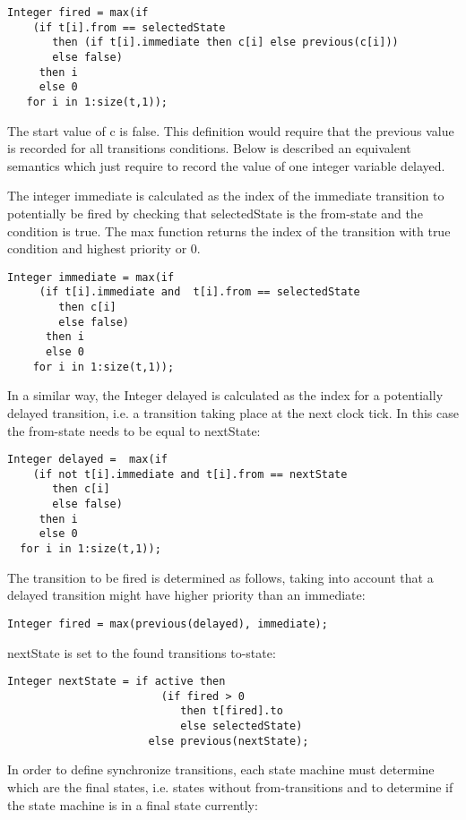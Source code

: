 \begin{lstlisting}[language=modelica]
  Integer fired = max(if
    (if t[i].from == selectedState
	   then (if t[i].immediate then c[i] else previous(c[i]))
	   else false)
	 then i
	 else 0
   for i in 1:size(t,1));
\end{lstlisting}
The start value of c is false. This definition would require that the
previous value is recorded for all transitions conditions. Below is
described an equivalent semantics which just require to record the value
of one integer variable delayed.

The integer immediate is calculated as the index of the immediate
transition to potentially be fired by checking that selectedState is the
from-state and the condition is true. The max function returns the index
of the transition with true condition and highest priority or 0.

\begin{lstlisting}[language=modelica]
  Integer immediate = max(if
     (if t[i].immediate and  t[i].from == selectedState
        then c[i]
		else false)
	  then i
	  else 0
	for i in 1:size(t,1));
\end{lstlisting}
In a similar way, the Integer delayed is calculated as the index for a
potentially delayed transition, i.e. a transition taking place at the
next clock tick. In this case the from-state needs to be equal to
nextState:

\begin{lstlisting}[language=modelica]
  Integer delayed =  max(if
    (if not t[i].immediate and t[i].from == nextState
	   then c[i]
	   else false)
	 then i
	 else 0
  for i in 1:size(t,1));
\end{lstlisting}
The transition to be fired is determined as follows, taking into account
that a delayed transition might have higher priority than an immediate:

\begin{lstlisting}[language=modelica]
  Integer fired = max(previous(delayed), immediate);
\end{lstlisting}
nextState is set to the found transitions to-state:

\begin{lstlisting}[language=modelica]
  Integer nextState = if active then
                        (if fired > 0
						   then t[fired].to
						   else selectedState)
					  else previous(nextState);
\end{lstlisting}
In order to define synchronize transitions, each state machine must
determine which are the final states, i.e. states without
from-transitions and to determine if the state machine is in a final
state currently:

